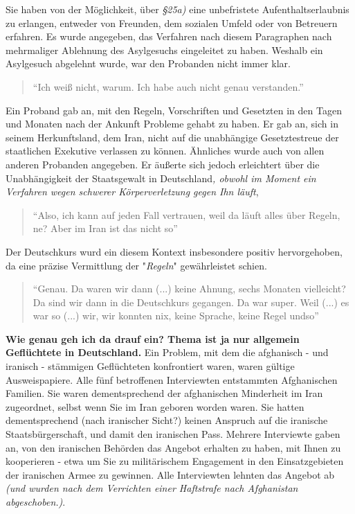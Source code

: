 Sie haben von der Möglichkeit, über \textit{§25a)} eine unbefristete Aufenthaltserlaubnis zu erlangen,  entweder von Freunden, dem sozialen Umfeld oder von Betreuern erfahren. Es wurde angegeben, das Verfahren nach diesem Paragraphen nach mehrmaliger Ablehnung des Asylgesuchs eingeleitet zu haben. 
Weshalb ein Asylgesuch abgelehnt wurde, war den Probanden nicht immer klar.
\begin{quote}
    ``Ich weiß nicht, warum. Ich habe auch nicht genau verstanden.''
\end{quote}
Ein Proband gab an, mit den Regeln, Vorschriften und Gesetzten in den Tagen und Monaten nach der Ankunft Probleme gehabt zu haben. Er gab an, sich in seinem Herkunftsland, dem Iran, nicht auf die unabhängige Gesetztestreue der staatlichen Exekutive verlassen zu können. Ähnliches wurde auch von allen anderen Probanden angegeben. Er äußerte sich jedoch erleichtert über die Unabhängigkeit der Staatsgewalt in Deutschland\textit{, obwohl im Moment ein Verfahren wegen schwerer Körperverletzung gegen Ihn läuft},
\begin{quote}
    ``Also, ich kann auf jeden Fall vertrauen, weil da läuft alles über Regeln, ne? Aber im Iran ist das nicht so''
\end{quote}
Der Deutschkurs wurd ein diesem Kontext insbesondere positiv hervorgehoben, da eine präzise Vermittlung der "\textit{Regeln}" gewährleistet schien.
\begin{quote}
    ``Genau. Da waren wir dann (...) keine Ahnung, sechs Monaten vielleicht? Da sind wir dann in die Deutschkurs gegangen. Da war super. Weil (...) es war so (...) wir, wir konnten nix, keine Sprache, keine Regel undso''
\end{quote}
\textbf{Wie genau geh ich da drauf ein? Thema ist ja nur allgemein Geflüchtete in Deutschland.}
Ein Problem, mit dem die afghanisch - und iranisch - stämmigen Geflüchteten konfrontiert waren, waren gültige Ausweispapiere.\newline
Alle fünf betroffenen Interviewten entstammten Afghanischen Familien. Sie waren dementsprechend der afghanischen Minderheit im Iran zugeordnet, selbst wenn Sie im Iran geboren worden waren. Sie hatten dementsprechend (nach iranischer Sicht?) keinen Anspruch auf die iranische Staatsbürgerschaft, und damit den iranischen Pass.\newline
Mehrere Interviewte gaben an, von den iranischen Behörden das Angebot erhalten zu haben, mit Ihnen zu kooperieren - etwa um Sie zu militärischem Engagement in den Einsatzgebieten der iranischen Armee zu gewinnen. Alle Interviewten lehnten das Angebot ab \textit{(und wurden nach dem Verrichten einer Haftstrafe nach Afghanistan abgeschoben.)}. 
